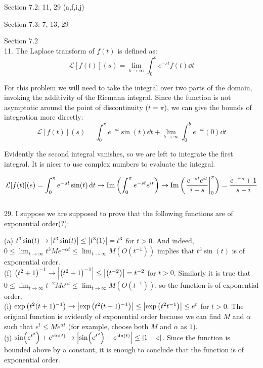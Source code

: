 \documentclass[11pt]{article}
\newcommand{\br}[1]{\left(#1\right)}
\newcommand{\lap}[2]{\mathcal{L}[#1](#2)}
\begin{document}
Section 7.2: 11, 29 (a,f,i,j)

Section 7.3: 7, 13, 29

Section 7.2\\

11. The Laplace transform of $f(t)$ is defined as:
$$\lap{f(t)}{s} = \lim_{b\to \infty}\int_0^b e^{-st}f(t) \dd{t}$$

For this problem we will need to take the integral over two parts of the domain, invoking the additivity of the Riemann integral. Since the function is not asymptotic around the point of discontinuity ($t = \pi$), we can give the bounds of integration more directly:
$$\lap{f(t)}{s} = \int_0^{\pi} e^{-st}\sin(t)\dd{t} + \lim_{b\to \infty}\int_0^b e^{-st}(0)\dd{t}$$

Evidently the second integral vanishes, so we are left to integrate the first integral. It is nicer to use complex numbers to evaluate the integral.

$$\lap{f(t)}{s} = \int_0^{\pi} e^{-st}\sin(t)\dd{t} \to \Im \br{\int_0^{\pi}e^{-st}e^{it}}\to \Im\br{\eval{\frac{e^{-st}e^{it}}{i-s}}_0^{\pi}} = \frac{e^{-\pi s}+1}{s-i}$$ \\

29. I suppose we are supposed to prove that the following functions are of exponential order(?):

(a) $t^3\sin(t) \to  \abs{t^3\sin(t)} \leq \abs{t^3(1)} = t^3$ for $t > 0$. And indeed, $0\leq \lim_{t\to \infty}t^3Me^{-\alpha t} \leq \lim_{t\to \infty}M\br{O(t^{-1})}$ implies that $t^3\sin(t)$ is of exponential order. \\

(f) $\br{t^2+1}^{-1} \to \abs{\br{t^2+1}^{-1}}\leq \abs{\br{t^{-2}}} = t^{-2}$ for $t>0$. Similarly it is true that $0 \leq \lim_{t\to \infty} t^{-2} Me^{\alpha t} \leq \lim_{t\to \infty} M \br{O(t^{-1})}$, so the function is of exponential order.\\

(i) $\exp \br{t^2(t+1)^{-1}} \to \abs{\exp \br{t^2(t+1)^{-1}}} \leq \abs{\exp \br{t^2t^{-1}}} \leq e^t$ for $t>0$. The original function is evidently of exponential order because we can find $M$ and $\alpha$ such that $e^t\leq Me^{\alpha t}$ (for example, choose both $M$ and $\alpha$ as $1$).\\

(j) $\sin(e^{t^2}) + e^{\sin(t)}\to \abs{\sin(e^{t^2}) + e^{\sin(t)}} \leq \abs{1 + e}$. Since the function is bounded above by a constant, it is enough to conclude that the function is of exponential order.\\
\end{document}
